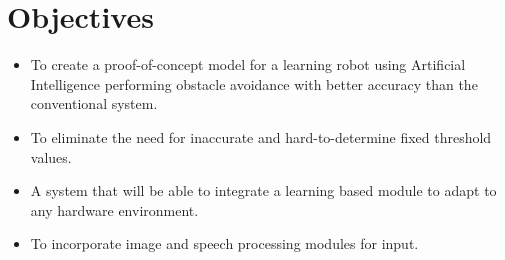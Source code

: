 \section{Objectives} \label{sec:objectives}

\begin{itemize}
  \item To create a proof-of-concept model for a learning robot using Artificial Intelligence performing obstacle avoidance with better accuracy than the conventional system. 
	\vspace{5mm}
	\item To eliminate the need for inaccurate and hard-to-determine fixed threshold values.
	\vspace{5mm}
	\item A system that will be able to integrate a learning based module to adapt to any hardware environment.
\vspace {5mm} 
\item To incorporate image and speech processing modules for input.
		
\end{itemize}